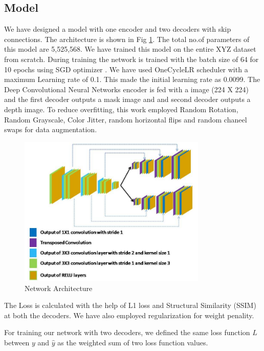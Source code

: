 \documentclass[review]{cvpr}
\begin{document}
\subsection{Model}
We have designed a model with one encoder and two decoders with skip connections. 
The architecture is shown in Fig \ref{fig:modelarch}. The total no.of parameters of this model are 5,525,568. 
We have trained this model on the entire XYZ dataset from scratch. 
During training the network is trained with the batch size of 64 for 10 epochs using SGD optimizer \cite{bottou2010large}. 
We have used OneCycleLR scheduler \cite{smith2018disciplined} with a maximum Learning rate of 0.1. 
This made the initial learning rate as 0.0099.
The Deep Convolutional Neural Networks encoder is fed with a image (224 X 224) and the first decoder outputs a mask 
image and and second decoder outputs a depth image. To reduce overfitting\cite{perez2017effectiveness}, 
this work employed Random Rotation, Random Grayscale, Color Jitter, random horizontal flips and random chaneel swaps for data augmentation.

\begin{figure}
\centering
  \includegraphics[width=0.8\textwidth]{networkarchitecture.jpg}
  \caption{Network Architecture}
  \label{fig:modelarch}
\end{figure}

The Loss is calculated with the help of L1 loss and Structural Similarity (SSIM) at both the decoders. 
We have also employed regularization for weight penality.

For training our network with two decoders, we defined the same loss function $L$ between $y$ and $\hat{y}$ as the weighted sum of 
two loss function values.
\end{document}
